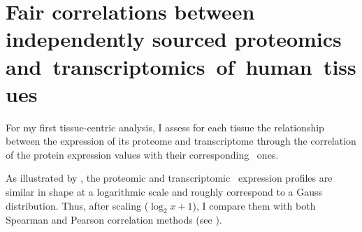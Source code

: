 
\section{Fair correlations between independently sourced proteomics~%
and~transcriptomics~of~human~tissues~}\label{subsec:IntegrationGoodCorrProtTrans}

For my first tissue-centric analysis,
I assess for each tissue the relationship between
the expression of its proteome and transcriptome
through the correlation of the protein expression values
with their corresponding \mRNA\ ones.\\
\vspace{-\baselineskip}

As illustrated by ,
the proteomic and transcriptomic \treps\ expression profiles are similar
in shape at a logarithmic scale
and roughly correspond to a Gauss distribution.
Thus, after scaling ($\log_2{x+1}$),
I compare them with both Spearman and Pearson correlation methods
(see ).\\
\vspace{-\baselineskip}

